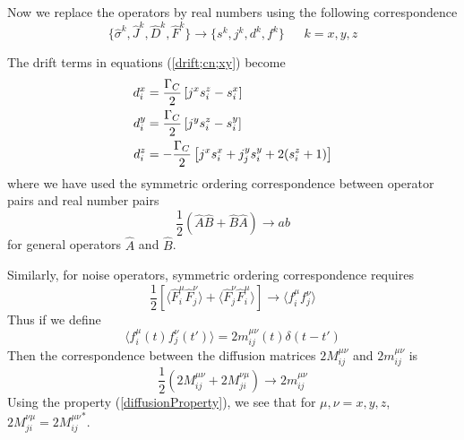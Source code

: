\documentclass{article}
\newcommand{\gc}{\Gamma_C}
\begin{document}
Now we replace the operators by real numbers using the following correspondence
\begin{equation}
    \{\hat{\sigma}^k, \hat{J}^k, \hat{D}^k, \hat{F}^k\} \longrightarrow \{s^k, j^k, d^k, f^k\}\ \ \ \ \ \ \  k=x,y,z
\end{equation}

The drift terms in equations (\ref{drift;cn;xy}) become
 \begin{align}
    \label{drift;cn;xy;cNumber}
     \notag d_i^x  & = \frac{\gc}{2}\left[j^x s_i^z-s_i^x\right]\\%
     d_i^y  & = \frac{\gc}{2}\left[j^y s_i^z-s_i^y\right]\\%
     \notag d_i^z & =  -\frac{\gc}{2}\left[j^xs_i^x+j_j^ys_i^y+2(s_i^z+1)\right]%
\end{align}
where we have used the symmetric ordering correspondence between operator pairs and real number pairs
\begin{equation}
    \frac{1}{2}\left(\hat{A}\hat{B}+\hat{B}\hat{A}\right) \longrightarrow ab
\end{equation}
for general operators $\hat{A}$ and $\hat{B}$.

Similarly, for noise operators, symmetric ordering correspondence requires
\begin{equation}
    \frac{1}{2}\left[ \langle \hat{F}_i^\mu\hat{F}_j^\nu\rangle+\langle\hat{F}_j^\nu\hat{F}_i^\mu\rangle\right]\longrightarrow\langle  f_i^\mu f_j^\nu \rangle
\end{equation}
Thus if we define
\begin{equation}
\label{def:diffusion;cNumber}
    \langle f_i^\mu(t)f_j^\nu(t')\rangle = 2m_{ij}^{\mu \nu}(t)\delta(t-t')
\end{equation}
Then the correspondence between the diffusion matrices $2M_{ij}^{\mu \nu}$ and $2m_{ij}^{\mu \nu}$ is 
\begin{equation}
    \frac{1}{2}\left(2M_{ij}^{\mu \nu}+2M_{ji}^{\nu \mu}\right) \longrightarrow 2m_{ij}^{\mu \nu}
\end{equation}
Using the property (\ref{diffusionProperty}), we see that for $\mu, \nu=x,y,z$, $2M_{ji}^{\nu \mu}={2M_{ij}^{\mu \nu}}^\ast$. 
\end{document}
